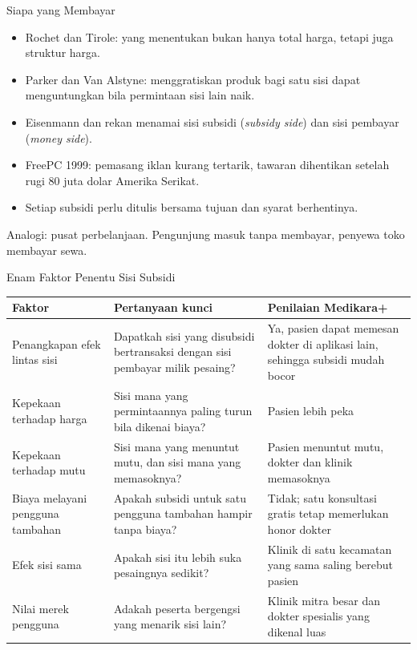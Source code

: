 \documentclass[aspectratio=169, table, 12pt]{beamer}
\begin{document}
\begin{frame}{{\Large Siapa yang Membayar}}
  \begin{itemize}
    \item Rochet dan Tirole: yang menentukan bukan hanya total harga, tetapi juga struktur harga.
    \item Parker dan Van Alstyne: menggratiskan produk bagi satu sisi dapat menguntungkan bila permintaan sisi lain naik.
    \item Eisenmann dan rekan menamai sisi subsidi (\textit{subsidy side}) dan sisi pembayar (\textit{money side}).
    \item FreePC 1999: pemasang iklan kurang tertarik, tawaran dihentikan setelah rugi 80 juta dolar Amerika Serikat.
    \item Setiap subsidi perlu ditulis bersama tujuan dan syarat berhentinya.
  \end{itemize}
  \vspace{2pt}
  {\footnotesize Analogi: pusat perbelanjaan. Pengunjung masuk tanpa membayar, penyewa toko membayar sewa.\par}
\end{frame}

\begin{frame}{{\Large Enam Faktor Penentu Sisi Subsidi}}
  \scriptsize
  \begin{tabularx}{\textwidth}{>{\raggedright\arraybackslash}p{2.8cm}
      >{\raggedright\arraybackslash}X
      >{\raggedright\arraybackslash}X}
    \hline
    \textbf{Faktor} & \textbf{Pertanyaan kunci} & \textbf{Penilaian Medikara+} \\ \hline
    Penangkapan efek lintas sisi & Dapatkah sisi yang disubsidi bertransaksi dengan sisi pembayar milik pesaing? & Ya, pasien dapat memesan dokter di aplikasi lain, sehingga subsidi mudah bocor \\ \hline
    Kepekaan terhadap harga & Sisi mana yang permintaannya paling turun bila dikenai biaya? & Pasien lebih peka \\ \hline
    Kepekaan terhadap mutu & Sisi mana yang menuntut mutu, dan sisi mana yang memasoknya? & Pasien menuntut mutu, dokter dan klinik memasoknya \\ \hline
    Biaya melayani pengguna tambahan & Apakah subsidi untuk satu pengguna tambahan hampir tanpa biaya? & Tidak; satu konsultasi gratis tetap memerlukan honor dokter \\ \hline
    Efek sisi sama & Apakah sisi itu lebih suka pesaingnya sedikit? & Klinik di satu kecamatan yang sama saling berebut pasien \\ \hline
    Nilai merek pengguna & Adakah peserta bergengsi yang menarik sisi lain? & Klinik mitra besar dan dokter spesialis yang dikenal luas \\ \hline
  \end{tabularx}
\end{frame}
\end{document}
